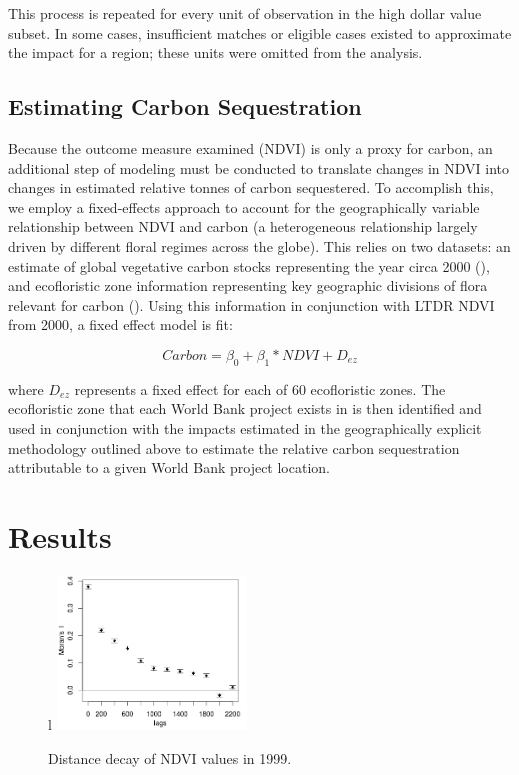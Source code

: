 \documentclass{article}\usepackage[]{graphicx}\usepackage[]{color}
\newenvironment{knitrout}{}{}  %
\begin{document}
\begin{knitrout}
\par

This process is repeated for every unit of observation in the high dollar value subset.  
In some cases, insufficient matches or eligible cases existed to approximate the impact for a region; these units were omitted from the analysis.

\subsection{Estimating Carbon Sequestration}
Because the outcome measure examined (NDVI) is only a proxy for carbon, an additional step of modeling must be conducted to translate changes in NDVI into changes in estimated relative tonnes of carbon sequestered.
To accomplish this, we employ a fixed-effects approach to account for the geographically variable relationship between NDVI and carbon (a heterogeneous relationship largely driven by different floral regimes across the globe).
This relies on two datasets: an estimate of global vegetative carbon stocks representing the year circa 2000 (\cite{saatchi_benchmark_2011}), and ecofloristic zone information representing key geographic divisions of flora relevant for carbon (\cite{ruesch_new_2008}).
Using this information in conjunction with LTDR NDVI from 2000, a fixed effect model is fit:

\begin{equation}
Carbon = \beta_{0} + \beta_{1} * NDVI + D_{ez}
\label{EQcarb}
\end{equation}

where \begin{math}D_{ez}\end{math} represents a fixed effect for each of 60 ecofloristic zones.  
The ecofloristic zone that each World Bank project exists in is then identified and used in conjunction with the impacts estimated in the geographically explicit methodology outlined above to estimate the relative carbon sequestration attributable to a given World Bank project location.

\newpage
\section{Results}

\begin{figure}{l}
\centering
 \includegraphics[width=0.45\textwidth]{pre_avg_NDVI_max_full}
\caption{Distance decay of NDVI values in 1999.}
  \label{DDFig}
\end{figure}


\end{knitrout}
\end{document}

